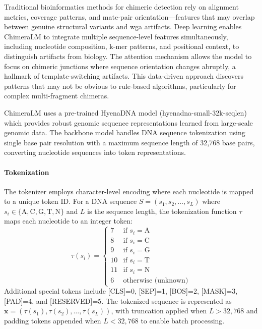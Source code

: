 \documentclass[pdflatex,sn-nature]{sn-jnl}%
\theoremstyle{thmstyleone}%
\theoremstyle{thmstyletwo}%
\theoremstyle{thmstylethree}%
\begin{document}
Traditional bioinformatics methods for chimeric detection rely on alignment metrics, coverage patterns, and mate-pair orientation---features that may overlap between genuine structural variants and \gls{wga} artifacts.
Deep learning enables ChimeraLM to integrate multiple sequence-level features simultaneously, including nucleotide composition, k-mer patterns, and positional context, to distinguish artifacts from biology.
The attention mechanism allows the model to focus on chimeric junctions where sequence orientation changes abruptly, a hallmark of template-switching artifacts.
This data-driven approach discovers patterns that may not be obvious to rule-based algorithms, particularly for complex multi-fragment chimeras.

ChimeraLM uses a pre-trained HyenaDNA model (hyenadna-small-32k-seqlen) which provides robust genomic sequence representations learned from large-scale genomic data.
The backbone model handles DNA sequence tokenization using single base pair resolution with a maximum sequence length of 32,768 base pairs, converting nucleotide sequences into token representations.

\paragraph{Tokenization}
The tokenizer employs character-level encoding where each nucleotide is mapped to a unique token ID.
For a DNA sequence $S = (s_1, s_2, \ldots, s_L)$ where $s_i \in \{\text{A}, \text{C}, \text{G}, \text{T}, \text{N}\}$ and $L$ is the sequence length, the tokenization function $\tau$ maps each nucleotide to an integer token:
$$
	\tau(s_i) = \begin{cases}
		7  & \text{if } s_i = \text{A}  \\
		8  & \text{if } s_i = \text{C}  \\
		9  & \text{if } s_i = \text{G}  \\
		10 & \text{if } s_i = \text{T}  \\
		11 & \text{if } s_i = \text{N}  \\
		6  & \text{otherwise (unknown)}
	\end{cases}
$$
Additional special tokens include [CLS]=0, [SEP]=1, [BOS]=2, [MASK]=3, [PAD]=4, and [RESERVED]=5.
The tokenized sequence is represented as $\mathbf{x} = (\tau(s_1), \tau(s_2), \ldots, \tau(s_L))$, with truncation applied when $L > 32{,}768$ and padding tokens appended when $L < 32{,}768$ to enable batch processing.
\end{document}
